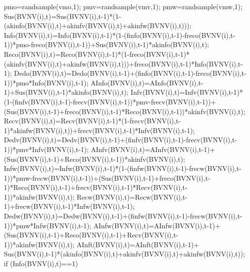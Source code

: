                                           pmo=randsample(vmo,1);
                                          pmv=randsample(vmv,1); 
                                          pmw=randsample(vmw,1);                                        
                                          Sus(BVNV(i),t)=Sus(BVNV(i),t-1)*(1-(akinfo(BVNV(i),t)+akinfv(BVNV(i),t)+akinfw(BVNV(i),t)));
                                          Info(BVNV(i),t)=Info(BVNV(i),t-1)*(1-(finfo(BVNV(i),t-1)-freco(BVNV(i),t-1))*pmo-freco(BVNV(i),t-1))+Sus(BVNV(i),t-1)*akinfo(BVNV(i),t);
                                          Reco(BVNV(i),t)=Reco(BVNV(i),t-1)*(1-freco(BVNV(i),t-1)*(akinfv(BVNV(i),t)+akinfw(BVNV(i),t)))+freco(BVNV(i),t-1)*Info(BVNV(i),t-1);
                                          Dedo(BVNV(i),t)=Dedo(BVNV(i),t-1)+(finfo(BVNV(i),t-1)-freco(BVNV(i),t-1))*pmo*Info(BVNV(i),t-1);
                                          AInfo(BVNV(i),t)=AInfo(BVNV(i),t-1)+Sus(BVNV(i),t-1)*akinfo(BVNV(i),t);                              
                                          Infv(BVNV(i),t)=Infv(BVNV(i),t-1)*(1-(finfv(BVNV(i),t-1)-frecv(BVNV(i),t-1))*pmv-frecv(BVNV(i),t-1))+(Sus(BVNV(i),t-1)+freco(BVNV(i),t-1)*Reco(BVNV(i),t-1))*akinfv(BVNV(i),t);
                                          Recv(BVNV(i),t)=Recv(BVNV(i),t-1)*(1-frecv(BVNV(i),t-1)*akinfw(BVNV(i),t))+frecv(BVNV(i),t-1)*Infv(BVNV(i),t-1);
                                          Dedv(BVNV(i),t)=Dedv(BVNV(i),t-1)+(finfv(BVNV(i),t-1)-frecv(BVNV(i),t-1))*pmv*Infv(BVNV(i),t-1);
                                          AInfv(BVNV(i),t)=AInfv(BVNV(i),t-1)+(Sus(BVNV(i),t-1)+Reco(BVNV(i),t-1))*akinfv(BVNV(i),t);
                                          Infw(BVNV(i),t)=Infw(BVNV(i),t-1)*(1-(finfw(BVNV(i),t-1)-frecw(BVNV(i),t-1))*pmw-frecw(BVNV(i),t-1))+(Sus(BVNV(i),t-1)+freco(BVNV(i),t-1)*Reco(BVNV(i),t-1)+frecv(BVNV(i),t-1)*Recv(BVNV(i),t-1))*akinfw(BVNV(i),t);
                                          Recw(BVNV(i),t)=Recw(BVNV(i),t-1)+frecw(BVNV(i),t-1)*Infw(BVNV(i),t-1);
                                          Dedw(BVNV(i),t)=Dedw(BVNV(i),t-1)+(finfw(BVNV(i),t-1)-frecw(BVNV(i),t-1))*pmw*Infw(BVNV(i),t-1);
                                          AInfw(BVNV(i),t)=AInfw(BVNV(i),t-1)+(Sus(BVNV(i),t-1)+Reco(BVNV(i),t-1)+Recv(BVNV(i),t-1))*akinfw(BVNV(i),t);                                           
                                          AInft(BVNV(i),t)=AInft(BVNV(i),t-1)+ Sus(BVNV(i),t-1)*(akinfo(BVNV(i),t)+akinfv(BVNV(i),t)+akinfw(BVNV(i),t));
                                          if (Info(BVNV(i),t)==1)
                                             
